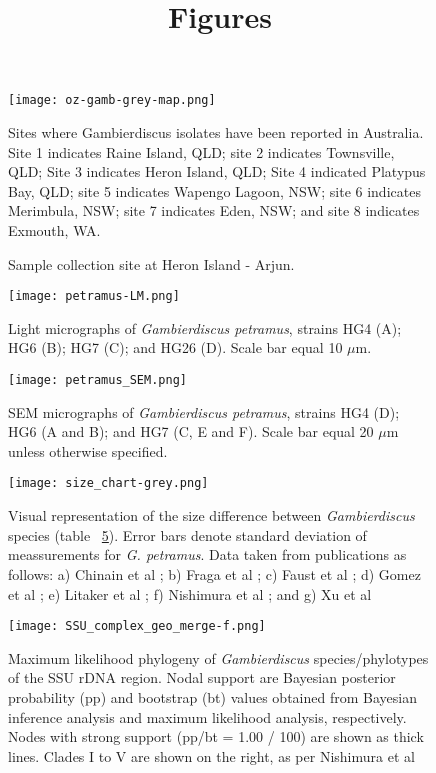 \documentclass[12pt]{article}
\title{Figures}
\begin{document}
\begin{figure} 
\texttt{[image: oz-gamb-grey-map.png]} 
\caption{Sites where Gambierdiscus isolates have been reported in Australia. Site 1 indicates Raine Island, QLD; site 2 indicates Townsville, QLD; Site 3 indicates Heron Island, QLD; Site 4 indicated Platypus Bay, QLD; site 5 indicates Wapengo Lagoon, NSW; site 6 indicates Merimbula, NSW; site 7 indicates Eden, NSW; and site 8 indicates Exmouth, WA.​} 
\label{fig:OzSites}
\end{figure} 

\FloatBarrier 
\begin{figure} 
\caption{Sample collection site at Heron Island - Arjun.} 
\label{fig:HeronMap}
\end{figure} 
\FloatBarrier 

\begin{figure} 
\texttt{[image: petramus-LM.png]} 
\caption{Light micrographs of \emph{Gambierdiscus petramus}, strains HG4 (A); HG6 (B); HG7 (C); and HG26 (D). Scale bar equal 10 $\mu$m.​} 
\label{fig:PetLM}
\end{figure} 

\FloatBarrier 
\begin{figure} 
\texttt{[image: petramus\_SEM.png]} 
\caption{SEM micrographs of \emph{Gambierdiscus petramus}, strains HG4 (D); HG6 (A and B); and HG7 (C, E and F). Scale bar equal 20 $\mu$m unless otherwise specified.} 
\label{fig:PetSEM}
\end{figure} 
\FloatBarrier 

\FloatBarrier 
\begin{figure} 
\texttt{[image: size\_chart-grey.png]} 
\caption{Visual representation of the size difference between \emph{Gambierdiscus} species (table ~\ref{fig:SizeGraph}). Error bars denote standard deviation of meassurements for \emph{G. petramus}. Data taken from publications as follows: a) Chinain et al \cite{chinain1999morphology}; b) Fraga et al \cite{fraga2014genus}; c) Faust et al \cite{faust1995observation}; d) Gomez et al \cite{gomez2015fukuyoa}; e) Litaker et al \cite{litaker2009taxonomy}; f) Nishimura et al \cite{nishimura2014morphology}; and g) Xu et al \cite{xu2014distribution}} 
\label{fig:SizeGraph}
\end{figure} 
\FloatBarrier 

\begin{figure} 
\texttt{[image: SSU\_complex\_geo\_merge-f.png]} 
\caption{Maximum likelihood phylogeny of \textit{Gambierdiscus} species/phylotypes of the SSU rDNA region. Nodal support are Bayesian posterior probability (pp) and bootstrap (bt) values obtained from Bayesian inference analysis and maximum likelihood analysis, respectively. Nodes with strong support (pp/bt = 1.00 / 100) are shown as thick lines. Clades I to V are shown on the right, as per Nishimura et al \cite{nishimura2013genetic}}
\label{fig:HGSSU} 
\end{figure} 
\FloatBarrier 
\end{document}
